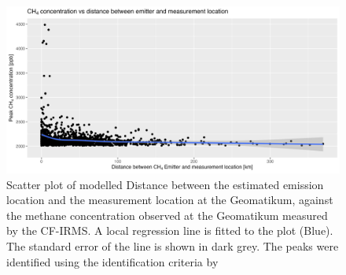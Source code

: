 \begin{figure}[htbp]
 \centering
 \includegraphics[width=1\textwidth]{figures/Appendix/Transportmodel/14_Low_WL_to_Peak_distance_paper_peaks.png}
 \caption[Distance between estimated emitter and measurement location]{Scatter plot of modelled Distance between the estimated emission location and the measurement location at the Geomatikum, against the methane concentration observed at the Geomatikum measured by the CF-IRMS. A local regression line is fitted to the plot (Blue). The standard error of the line is shown in dark grey. The peaks were identified using the identification criteria by \cite{Menoud.2021}}
 \label{DistancePlotPaperAppendix}
\end{figure}

